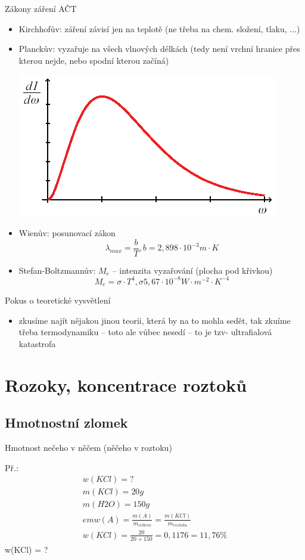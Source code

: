 \documentclass{article}
\begin{document}
Zákony záření AČT
\begin{itemize}
    \item Kirchhofův: záření závisí jen na teplotě (ne třeba na chem. složení, tlaku, ...)
    \item Planckův: vyzařuje na všech vlnových délkách (tedy není vrchní hranice přes kterou nejde, nebo spodní kterou začíná)
    \begin{center}
        \includegraphics{act.png}
    \end{center}
    \item Wienův: posunovací zákon
    \[
        \lambda_{max} = \frac{b}{T}, b = 2,898 \cdot 10^{-3} m\cdot K
    \]
    \item Stefan-Boltzmannův: $M_e$ -- intenzita vyzařování (plocha pod křivkou)
    \[
        M_e = \sigma \cdot T^4, \sigma 5,67 \cdot 10^{-8} W\cdot m^{-2}\cdot K^{-4}
    \]
\end{itemize}

Pokus o teoretické vysvětlení
\begin{itemize}
    \item zkusíme najít nějakou jinou teorii, která by na to mohla sedět, tak zkuíme třeba termodynamiku -- toto ale vůbec nesedí -- to je tzv- ultrafialová katastrofa
\end{itemize}

\section{Rozoky, koncentrace roztoků}
\subsection{Hmotnostní zlomek}
Hmotnost nečeho v něčem (něčeho v roztoku)

Př.: \begin{align*}
w(KCl) = ?\\
m(KCl) = 20g\\
m(H2O) = 150g\\ em
w(A) = \frac{m(A)}{m_{celkem}} = \frac{m(KCl)}{m_{roztoku}}\\
w(KCl) = \frac{20}{20+150}=0,1176= 11,76\%
\end{align*}
w(KCl) = ?
\end{document}
